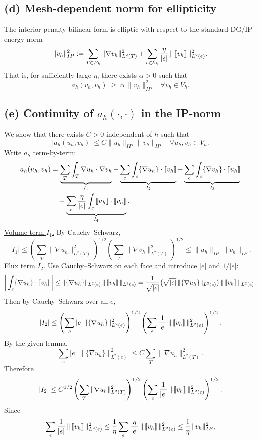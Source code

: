 \subsection*{(d) Mesh-dependent norm for ellipticity}
The interior penalty bilinear form is elliptic with respect to the standard DG/IP
energy norm
\[
    \|v_h\|_{IP}^2
    := \sum_{T\in\mathcal{P}_h} \|\nabla v_h\|_{L^2(T)}^2
    + \sum_{e\in\mathcal{E}_h} \frac{\eta}{|e|}\,\|\left[\!\left[ v_h \right]\!\right]\|_{L^2(e)}^2.
\]
That is, for sufficiently large $\eta$, there exists $\alpha>0$ such that
\[
    a_h(v_h,v_h) \;\ge\; \alpha\,\|v_h\|_{IP}^2
    \quad \forall v_h\in V_h.
\]
\subsection*{(e) Continuity of $a_h(\cdot,\cdot)$ in the IP-norm}
We show that there exists $C>0$ independent of $h$ such that
\[
    |a_h(u_h,v_h)| \le C \|u_h\|_{IP}\,\|v_h\|_{IP}
    \quad \forall u_h,v_h\in V_h.
\]
Write $a_h$ term-by-term:
\[
    \begin{aligned}
        a_h(u_h,v_h)
         & = \underbrace{\sum_T \int_T \nabla u_h\cdot\nabla v_h}_{I_1}
        - \underbrace{\sum_e \int_e \{\nabla u_h\}\cdot\jump{v_h}}_{I_2}
        - \underbrace{\sum_e \int_e \{\nabla v_h\}\cdot\jump{u_h}}_{I_3}                        \\
         & \quad + \underbrace{\sum_e \frac{\eta}{|e|} \int_e \jump{u_h}\cdot\jump{v_h}}_{I_4}.
    \end{aligned}
\]
\underline{Volume term $I_1$.}
By Cauchy--Schwarz,
\[
    |I_1|
    \le \left(\sum_T \|\nabla u_h\|_{L^2(T)}^2\right)^{1/2}
    \left(\sum_T \|\nabla v_h\|_{L^2(T)}^2\right)^{1/2}
    \le \|u_h\|_{IP}\,\|v_h\|_{IP}.
\]
\underline{Flux term $I_2$.}
Use Cauchy--Schwarz on each face and introduce $|e|$ and $1/|e|$:
\[
    \bigg|\int_e \{\nabla u_h\}\cdot\left[\!\left[ v_h \right]\!\right]\bigg|
    \le \|\{\nabla u_h\}\|_{L^2(e)} \,\|\left[\!\left[ v_h \right]\!\right]\|_{L^2(e)}
    = \frac{1}{\sqrt{|e|}}\big(\sqrt{|e|}\,\|\{\nabla u_h\}\|_{L^2(e)}\big)\,\|\left[\!\left[ v_h \right]\!\right]\|_{L^2(e)}.
\]
Then by Cauchy--Schwarz over all $e$,
\[
    |I_2|
    \le \left(\sum_e |e|\,\|\{\nabla u_h\}\|_{L^2(e)}^2\right)^{1/2}
    \left(\sum_e \frac{1}{|e|}\,\|\left[\!\left[ v_h \right]\!\right]\|_{L^2(e)}^2\right)^{1/2}.
\]
By the given lemma,
\[
    \sum_e |e|\,\|\{\nabla u_h\}\|_{L^2(e)}^2
    \le C \sum_T \|\nabla u_h\|_{L^2(T)}^2.
\]
Therefore
\[
    |I_2|
    \le C^{1/2} \left(\sum_T \|\nabla u_h\|_{L^2(T)}^2\right)^{1/2}
    \left(\sum_e \frac{1}{|e|}\,\|\left[\!\left[ v_h \right]\!\right]\|_{L^2(e)}^2\right)^{1/2}.
\]
Since
\[
    \sum_e \frac{1}{|e|}\,\|\left[\!\left[ v_h \right]\!\right]\|_{L^2(e)}^2
    \le \frac{1}{\eta} \sum_e \frac{\eta}{|e|}\,\|\left[\!\left[ v_h \right]\!\right]\|_{L^2(e)}^2
    \le \frac{1}{\eta}\,\|v_h\|_{IP}^2,
\]
